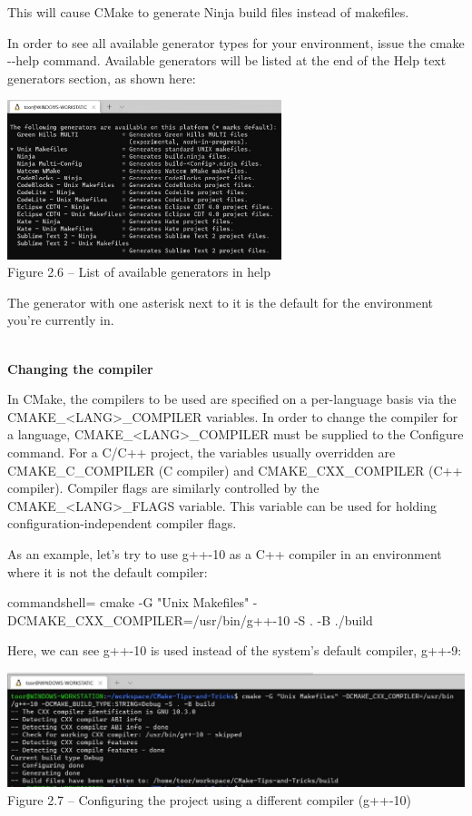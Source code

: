This will cause CMake to generate Ninja build files instead of makefiles.

In order to see all available generator types for your environment, issue the cmake -{}-help command. Available generators will be listed at the end of the Help text generators section, as shown here:

\begin{center}
\includegraphics[width=0.6\textwidth]{content/1/chapter2/images/6.jpg}\\
Figure 2.6 – List of available generators in help
\end{center}

The generator with one asterisk next to it is the default for the environment you're currently in.

\hspace*{\fill} \\ %
\noindent
\textbf{Changing the compiler}

In CMake, the compilers to be used are specified on a per-language basis via the CMAKE\_<LANG>\_COMPILER variables. In order to change the compiler for a language, CMAKE\_<LANG>\_COMPILER must be supplied to the Configure command. For a C/C++ project, the variables usually overridden are CMAKE\_C\_COMPILER (C compiler) and CMAKE\_CXX\_COMPILER (C++ compiler). Compiler flags are similarly controlled by the CMAKE\_<LANG>\_FLAGS variable. This variable can be used for holding configuration-independent compiler flags.

As an example, let's try to use g++-10 as a C++ compiler in an environment where it is not the default compiler:

\begin{tcblisting}{commandshell={}}
cmake -G "Unix Makefiles" -DCMAKE_CXX_COMPILER=/usr/bin/g++-10 -S .  
  -B ./build
\end{tcblisting}

Here, we can see g++-10 is used instead of the system's default compiler, g++-9:

\begin{center}
\includegraphics[width=1.\textwidth]{content/1/chapter2/images/7.jpg}\\
Figure 2.7 – Configuring the project using a different compiler (g++-10)
\end{center}

